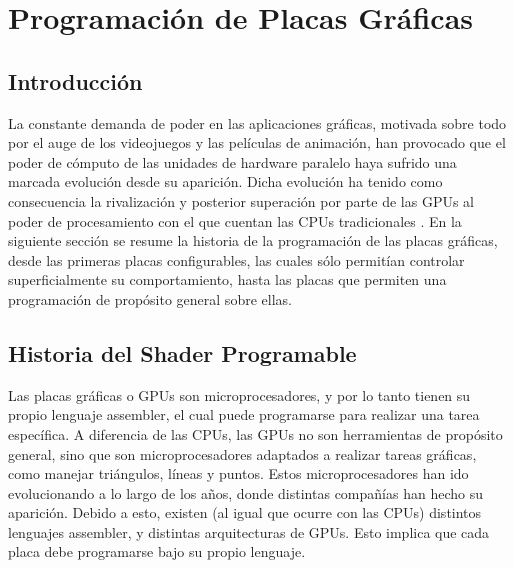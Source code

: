 \chapter{Programación de Placas Gráficas}

\section{Introducci\'on}
La constante demanda de poder en las aplicaciones gr\'aficas, motivada sobre todo por el auge de los videojuegos y las películas de animación, han provocado que el poder de cómputo de las unidades de hardware paralelo haya sufrido una marcada evoluci\'on desde su aparici\'on.
Dicha evoluci\'on ha tenido como consecuencia la rivalizaci\'on y posterior superaci\'on por parte de las GPUs al poder de procesamiento con el que cuentan las CPUs tradicionales \cite{Harris06}.
En la siguiente sección se resume la historia de la programación de las placas gráficas, desde las primeras placas configurables, las cuales sólo permitían controlar superficialmente su comportamiento, hasta las placas que permiten una programación de propósito general sobre ellas.

\section{Historia del Shader Programable}
Las placas gráficas o GPUs son microprocesadores, y por lo tanto tienen su propio lenguaje assembler, el cual puede programarse para realizar una tarea específica.
A diferencia de las CPUs, las GPUs no son herramientas de propósito general, sino que son microprocesadores adaptados a realizar tareas gráficas, como manejar triángulos, líneas y puntos.
Estos microprocesadores han ido evolucionando a lo largo de los años, donde distintas compañías han hecho su aparición.
Debido a esto, existen (al igual que ocurre con las CPUs) distintos lenguajes assembler, y distintas arquitecturas de GPUs.
Esto implica que cada placa debe programarse bajo su propio lenguaje.

